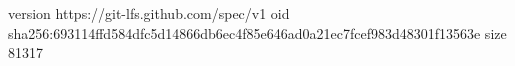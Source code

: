 version https://git-lfs.github.com/spec/v1
oid sha256:693114ffd584dfc5d14866db6ec4f85e646ad0a21ec7fcef983d48301f13563e
size 81317
